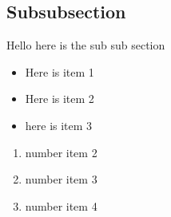 \subsection{Subsubsection}

Hello here is the sub sub section

\begin{itemize}
\item Here is item 1
\item Here is item 2
\item here is item 3
\end{itemize}

\begin{enumerate}
\item number item 2
\item number item 3
\item number item 4
\end{enumerate}

